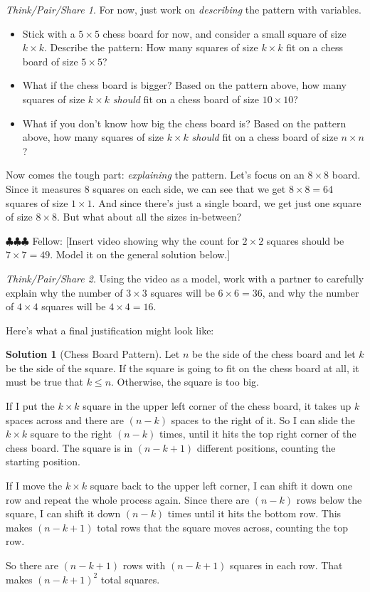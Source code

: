 \documentclass[10pt, reqno]{amsart}
\theoremstyle{remark}
\newtheorem*{thinkpair*}{Think/Pair/Share}
\theoremstyle{definition}
\newtheorem*{sol*}{Solution}
\numberwithin{equation}{section}  %
\newcommand{\fellow}[1]{{\color{magenta} \sf $\clubsuit\clubsuit\clubsuit$ Fellow: [#1]}}
\begin{document}
\begin{thinkpair*}
For now, just work on \emph{describing} the pattern with variables.  
\begin{itemize}
\item
Stick with a $5 \times 5 $ chess board for now, and consider a small square of size $k \times k$.  Describe the pattern: How many squares of size $k \times k$ fit on a chess board of size $5\times 5$?
\item
What if the chess board is bigger?  Based on the pattern above,  how many squares of size $k \times k$ \emph{should} fit on a chess board of size $10 \times 10$?
\item
What if you don't know how big the chess board is?  Based on the pattern above,  how many squares of size $k \times k$ \emph{should} fit on a chess board of size $n \times n$?
\end{itemize}
\end{thinkpair*}

Now comes the tough part: \emph{explaining} the pattern.  Let's focus on an $8 \times 8$ board.  Since it measures $8$ squares on each side, we can see that we get $8 \times 8 = 64$ squares of size $1 \times 1$.  And since there's just a single board, we get just one square of size $8 \times 8$.  But what about all the sizes in-between?

\fellow{Insert video showing why the count for $2 \times 2$ squares should be $7 \times 7  = 49$.  Model it on the general solution below.}

\begin{thinkpair*}
Using the video as a model, work with a partner to carefully explain why the number of $3 \times 3$ squares will be $6 \times 6 = 36$, and why the number of $4 \times 4$ squares will be $4 \times 4 = 16$.
\end{thinkpair*} 

Here's what a final justification might look like:  

\begin{sol*}[Chess Board Pattern]
Let $n$ be the side of the chess board and let $k$ be the side of the square.  If the square is going to fit on the chess board at all, it must be true that $k \leq n$.  Otherwise, the square is too big.

If I put the $k \times k$ square in the upper left corner of the chess board, it takes up $k$ spaces across and there are $(n-k)$ spaces to the right of it.  So I can slide the $k \times k$ square to the right $(n-k)$ times, until it hits the top right corner of the chess board.  The square is in $(n-k+1)$ different positions, counting the starting position.

If I move the $k \times k$ square back to the upper left corner, I can shift it down one row and repeat the whole process again.  Since there are $(n-k)$ rows below the square, I can shift it down $(n-k)$ times until it hits the bottom row.  This makes $(n-k+1)$ total rows that the square moves across, counting the top row.

So there are $(n-k+1)$ rows with $(n-k+1)$ squares in each row.  That makes $(n-k+1)^2$ total squares.  
\end{sol*}
\end{document}
